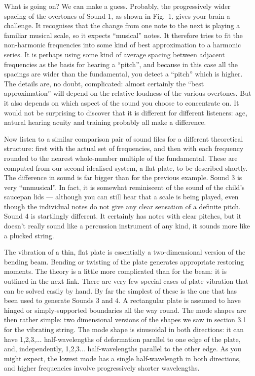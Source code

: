   What is going on? We can make a guess. Probably, the progressively wider 
  spacing of the overtones of Sound 1, as shown in Fig.\ 1, gives your brain a 
  challenge. It recognises that the change from one note to the next is playing 
  a familiar musical scale, so it expects ``musical'' notes. It therefore tries 
  to fit the non-harmonic frequencies into some kind of best approximation to a 
  harmonic series. It is perhaps using some kind of average spacing between 
  adjacent frequencies as the basis for hearing a ``pitch'', and because in 
  this case all the spacings are wider than the fundamental, you detect a 
  ``pitch'' which is higher. The details are, no doubt, complicated: almost 
  certainly the ``best approximation'' will depend on the relative loudness of 
  the various overtones. But it also depends on which aspect of the sound you 
  choose to concentrate on. It would not be surprising to discover that it is 
  different for different listeners: age, natural hearing acuity and training 
  probably all make a difference. 

  Now listen to a similar comparison pair of sound files for a different 
  theoretical structure: first with the actual set of frequencies, and then 
  with each frequency rounded to the nearest whole-number multiple of the 
  fundamental. These are computed from our second idealised system, a flat 
  plate, to be described shortly. The difference in sound is far bigger than 
  for the previous example. Sound 3 is very ``unmusical''. In fact, it is 
  somewhat reminiscent of the sound of the child's saucepan lids --- although 
  you can still hear that a scale is being played, even though the individual 
  notes do not give any clear sensation of a definite pitch. Sound 4 is 
  startlingly different. It certainly has notes with clear pitches, but it 
  doesn't really sound like a percussion instrument of any kind, it sounds more 
  like a plucked string. 

  The vibration of a thin, flat plate is essentially a two-dimensional version 
  of the bending beam. Bending or twisting of the plate generates appropriate 
  restoring moments. The theory is a little more complicated than for the beam: 
  it is outlined in the next link. There are very few special cases of plate 
  vibration that can be solved easily by hand. By far the simplest of these is 
  the one that has been used to generate Sounds 3 and 4. A rectangular plate is 
  assumed to have hinged or simply-supported boundaries all the way round. The 
  mode shapes are then rather simple: two dimensional versions of the shapes we 
  saw in section 3.1 for the vibrating string. The mode shape is sinusoidal in 
  both directions: it can have 1,2,3,... half-wavelengths of deformation 
  parallel to one edge of the plate, and, independently, 1,2,3... 
  half-wavelengths parallel to the other edge. As you might expect, the lowest 
  mode has a single half-wavelength in both directions, and higher frequencies 
  involve progressively shorter wavelengths. 

